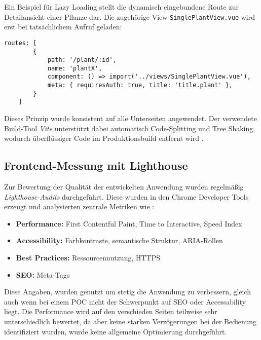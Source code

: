 Ein Beispiel für Lazy Loading stellt die dynamisch eingebundene Route zur Detailansicht einer Pflanze dar. Die zugehörige View \texttt{SinglePlantView.vue} wird erst bei tatsächlichem Aufruf geladen:

\begin{lstlisting}[caption=Lazy Loading per Route in Vue Router]
	routes: [
		{
			path: '/plant/:id',
			name: 'plantX',
			component: () => import('../views/SinglePlantView.vue'),
			meta: { requiresAuth: true, title: 'title.plant' },
		}
	]
\end{lstlisting}

Dieses Prinzip wurde konsistent auf alle Unterseiten angewendet. Der verwendete Build-Tool \emph{Vite} unterstützt dabei automatisch Code-Splitting und Tree Shaking, wodurch überflüssiger Code im Produktionsbuild entfernt wird \cite{ViteDocs2024,RollupDocs2024}.

\subsection{Frontend-Messung mit Lighthouse}

Zur Bewertung der Qualität der entwickelten Anwendung wurden regelmäßig \emph{Lighthouse-Audits} durchgeführt. Diese wurden in den Chrome Developer Tools erzeugt und analysierten zentrale Metriken wie \cite{GoogleLighthouse2024}:

\begin{itemize}
	\item \textbf{Performance:} First Contentful Paint, Time to Interactive, Speed Index
	\item \textbf{Accessibility:} Farbkontraste, semantische Struktur, ARIA-Rollen
	\item \textbf{Best Practices:} Ressourcennutzung, HTTPS
	\item  \textbf{SEO:}  Meta-Tags
\end{itemize}

Diese Angaben, wurden genutzt um stetig die Anwendung zu verbessern, gleich auch wenn bei einem \ac{POC} nicht der Schwerpunkt auf \ac{SEO} oder Accessability liegt. Die Performance wird auf den verschieden Seiten teilweise sehr unterschiedlich bewertet, da aber keine starken Verzögerungen bei der Bedienung identifiziert wurden, wurde keine allgemeine Optimierung durchgeführt.